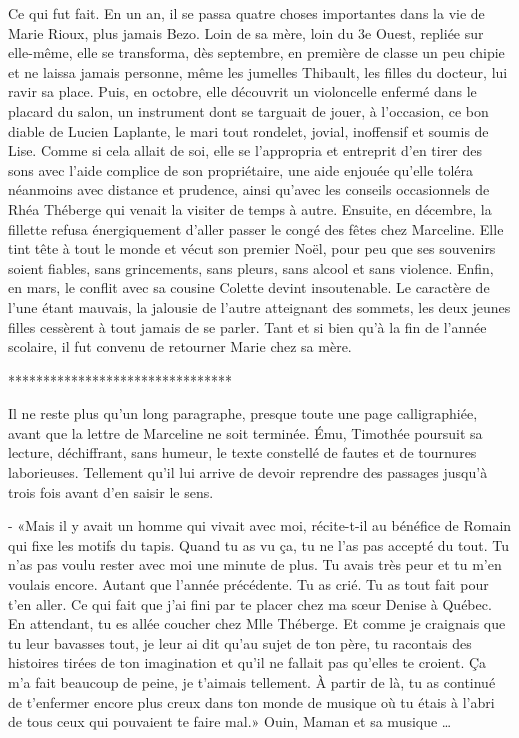 Ce qui fut fait. En un an, il se passa quatre choses importantes dans la vie de Marie Rioux, plus jamais Bezo. Loin de sa mère, loin du 3e Ouest, repliée sur elle-même, elle se transforma, dès septembre, en première de classe un peu chipie et ne laissa jamais personne, même les jumelles Thibault, les filles du docteur, lui ravir sa place. Puis, en octobre, elle découvrit un violoncelle enfermé dans le placard du salon, un instrument dont se targuait de jouer, à l’occasion, ce bon diable de Lucien Laplante, le mari tout rondelet, jovial, inoffensif et soumis de Lise. Comme si cela allait de soi, elle se l’appropria et entreprit d’en tirer des sons avec l’aide complice de son propriétaire, une aide enjouée qu’elle toléra néanmoins avec distance et prudence, ainsi qu’avec les conseils occasionnels de Rhéa Théberge qui venait la visiter de temps à autre. Ensuite, en décembre, la fillette refusa énergiquement d’aller passer le congé des fêtes chez Marceline. Elle tint tête à tout le monde et vécut son premier Noël, pour peu que ses souvenirs soient fiables, sans grincements, sans pleurs, sans alcool et sans violence. Enfin, en mars, le conflit avec sa cousine Colette devint insoutenable. Le caractère de l’une étant mauvais, la jalousie de l’autre atteignant des sommets, les deux jeunes filles cessèrent à tout jamais de se parler. Tant et si bien qu’à la fin de l’année scolaire, il fut convenu de retourner Marie chez sa mère.

********************************

Il ne reste plus qu’un long paragraphe, presque toute une page calligraphiée, avant que la lettre de Marceline ne soit terminée. Ému, Timothée poursuit sa lecture, déchiffrant, sans humeur, le texte constellé de fautes et de tournures laborieuses. Tellement qu’il lui arrive de devoir reprendre des passages jusqu’à trois fois avant d’en saisir le sens.

- «Mais il y avait un homme qui vivait avec moi, récite-t-il au bénéfice de Romain qui fixe les motifs du tapis. Quand tu as vu ça, tu ne l’as pas accepté du tout. Tu n’as pas voulu rester avec moi une minute de plus. Tu avais très peur et tu m’en voulais encore. Autant que l’année précédente. Tu as crié. Tu as tout fait pour t’en aller. Ce qui fait que j’ai fini par te placer chez ma sœur Denise à Québec. En attendant, tu es allée coucher chez Mlle Théberge. Et comme je craignais que tu leur bavasses tout, je leur ai dit qu’au sujet de ton père, tu racontais des histoires tirées de ton imagination et qu’il ne fallait pas qu’elles te croient. Ça m’a fait beaucoup de peine, je t’aimais tellement. À partir de là, tu as continué de t’enfermer encore plus creux dans ton monde de musique où tu étais à l’abri de tous ceux qui pouvaient te faire mal.» Ouin, Maman et sa musique …

